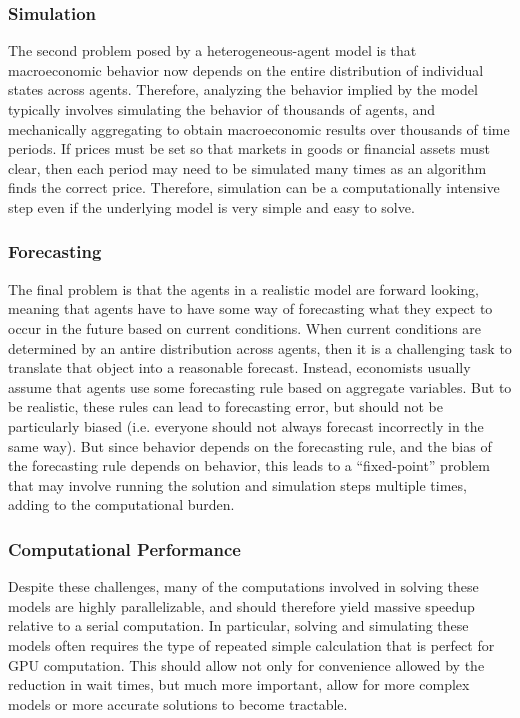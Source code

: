 \documentclass[a4paper,12pt]{article}
\numberwithin{equation}{section}
\theoremstyle{definition}
\begin{document}
\subsubsection{Simulation}

The second problem posed by a heterogeneous-agent model is that
macroeconomic behavior now depends on the entire distribution of
individual states across agents. Therefore, analyzing the behavior
implied by the model typically involves simulating the behavior of
thousands of agents, and mechanically aggregating to obtain
macroeconomic results over thousands of time periods. If prices must
be set so that markets in goods or financial assets must clear, then
each period may need to be simulated many times as an algorithm finds
the correct price. Therefore, simulation can be a computationally
intensive step even if the underlying model is very simple and easy to
solve.

\subsubsection{Forecasting}

The final problem is that the agents in a
realistic model are forward looking, meaning that agents have to have
some way of forecasting what they expect to occur in the future based
on current conditions. When current conditions are determined by an
antire distribution across agents, then it is a challenging task to
translate that object into a reasonable forecast. Instead, economists
usually assume that agents use some forecasting rule based on
aggregate variables. But to be realistic, these rules can lead to
forecasting error, but should not be particularly biased
(i.e. everyone should not always forecast incorrectly in the same
way). But since behavior depends on the forecasting rule, and the bias
of the forecasting rule depends on behavior, this leads to a
``fixed-point'' problem that may involve running the solution and
simulation steps multiple times, adding to the computational burden.

\subsubsection{Computational Performance}

Despite these challenges, many of the computations involved in solving these
models are highly parallelizable, and should therefore yield massive
speedup relative to a serial computation. In particular, solving and
simulating these models often requires the type of repeated simple
calculation that is perfect for GPU computation. This should allow not
only for convenience allowed by the reduction in wait times, but much
more important, allow for more complex models or more accurate
solutions to become tractable.
\end{document}
